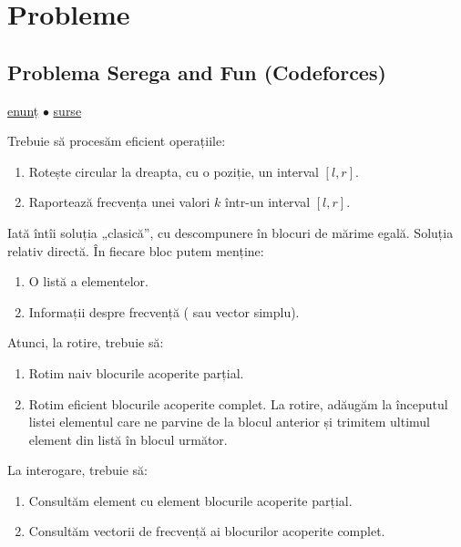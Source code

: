 \section{Probleme}

\subsection{Problema Serega and Fun (Codeforces)}
\label{problem:serega-and-fun}

\href{https://codeforces.com/contest/455/problem/D}{enunț}
$\bullet$
\hyperref[code:serega-and-fun]{surse}

Trebuie să procesăm eficient operațiile:

\begin{enumerate}
  \item Rotește circular la dreapta, cu o poziție, un interval $[l, r]$.
  \item Raportează frecvența unei valori $k$ într-un interval $[l, r]$.
\end{enumerate}

Iată întîi soluția „clasică”, cu descompunere în blocuri de mărime egală. Soluția relativ directă. În fiecare bloc putem menține:

\begin{enumerate}
  \item O listă a elementelor.
  \item Informații despre frecvență ( sau vector simplu).
\end{enumerate}

Atunci, la rotire, trebuie să:

\begin{enumerate}
  \item Rotim naiv blocurile acoperite parțial.
  \item Rotim eficient blocurile acoperite complet. La rotire, adăugăm la începutul listei elementul care ne parvine de la blocul anterior și trimitem ultimul element din listă în blocul următor.
\end{enumerate}

La interogare, trebuie să:

\begin{enumerate}
  \item Consultăm element cu element blocurile acoperite parțial.
  \item Consultăm vectorii de frecvență ai blocurilor acoperite complet.
\end{enumerate}

